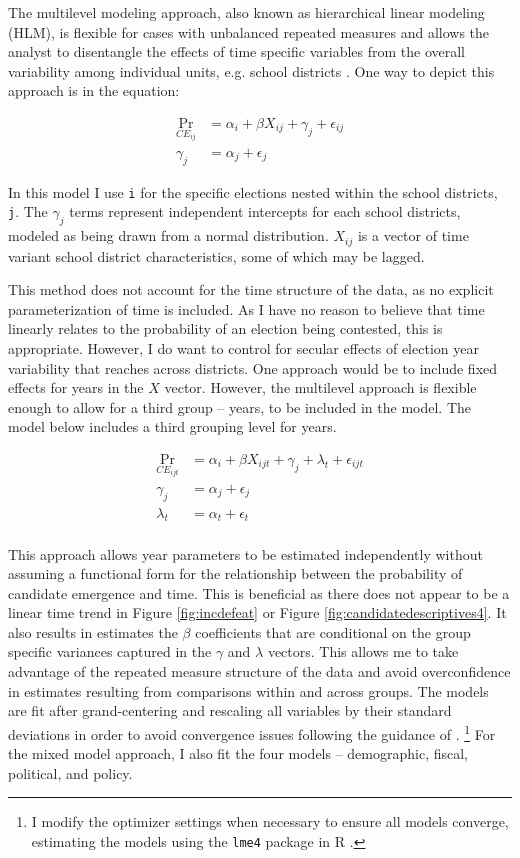 The multilevel modeling approach, also known as hierarchical linear modeling (HLM), 
is flexible for cases with unbalanced repeated measures and allows the analyst to 
disentangle the effects of time specific variables from the overall variability 
among individual units, e.g. school districts \citep{mlmod,raudbryk}. One way to depict 
this approach is in the equation:

\begin{align*} 
\Pr_{CE_{ij}} &= \alpha_{i} + \beta X_{ij} + \gamma_{j} + \epsilon_{ij}   \\ 
\gamma_{j} &=  \alpha_{j} + \epsilon_{j}
\end{align*}

In this model I use \texttt{i} for the specific elections nested within the school 
districts, \texttt{j}. The $\gamma_{j}$ terms represent independent intercepts for each school 
districts, modeled as being drawn from a normal distribution. $X_{ij}$ is a vector of time 
variant school district characteristics, some of which may be lagged. 

This method does not account for the time structure of the data, as no 
explicit parameterization of time is included. As I have no reason to believe that 
time linearly relates to the probability of an election being contested, this is 
appropriate. However, I do want to control for secular effects of election year 
variability that reaches across districts. One approach would be to include 
fixed effects for years in the $X$ vector. However, the multilevel approach is 
flexible enough to allow for a third group -- years, to be included in the model. 
The model below includes a third grouping level for years. 

\begin{align*} 
\Pr_{CE_{ijt}} &= \alpha_{i} + \beta X_{ijt} + \gamma_{j} + \lambda_{t} + \epsilon_{ijt}   \\ 
\gamma_{j} &= \alpha_{j} + \epsilon_{j} \\ 
\lambda_{t} &= \alpha_{t} + \epsilon_{t} \\
\end{align*}

This approach allows year parameters to be estimated independently without assuming 
a functional form for the relationship between the probability of candidate emergence 
and time. This is beneficial as there does not appear to be a linear time trend 
in Figure \ref{fig:incdefeat} or Figure \ref{fig:candidatedescriptives4}. 
It also results in estimates the $\beta$ coefficients that are conditional 
on the group specific variances captured in the $\gamma$ and $\lambda$ vectors. 
This allows me to take advantage of the repeated measure structure of the data and 
avoid overconfidence in estimates resulting from comparisons within and across groups. 
The models are fit after grand-centering and rescaling all variables by their 
standard deviations in order to avoid convergence issues following the guidance of \citet{gelhill}.
\footnote{I modify the optimizer settings when necessary to ensure all models converge, estimating 
the models using the \texttt{lme4} package in R \citep{lme4, cran}.} For the mixed model 
approach, I also fit the four models -- demographic, fiscal, political, and policy. 

